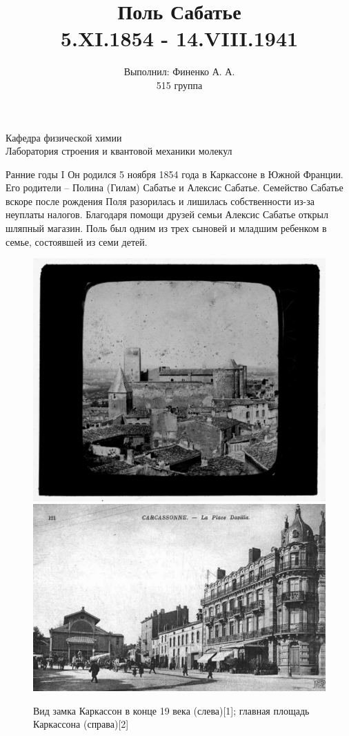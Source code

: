 \documentclass[hyperref={pdfpagelabel=false},usepdftitle=false,xcolor=dvipsnames]{beamer}
\title{\textbf{Поль Сабатье \\ 5.XI.1854 - 14.VIII.1941}}
\author{\small
\begin{flushright}
Выполнил: Финенко А. А. \\ 515 группа \\[15ex]
\end{flushright}
}
\institute[MSU] %
{\small МГУ им. М.В.Ломоносова, Химический факультет, 2017}
\date{}
\begin{document}
\begin{frame}
{
\vspace*{-0.75cm}
\large 
\begin{center}
Кафедра физической химии \\
Лаборатория строения и квантовой механики молекул
\vspace*{-0.75cm}
\end{center}}
 \titlepage
\end{frame}

\begin{frame}{Ранние годы I}
Он родился 5 ноября 1854 года в Каркассоне в Южной Франции. Его родители -- Полина (Гилам) Сабатье и Алексис Сабатье. Семейство Сабатье вскоре после рождения Поля разорилась и лишилась собственности из-за неуплаты налогов. Благодаря помощи друзей семьи Алексис Сабатье открыл шляпный магазин. Поль был одним из трех сыновей и младшим ребенком в семье, состоявшей из семи детей. 
\begin{figure}	
	\includegraphics[width=0.37\linewidth]{pictures/carcassone1.jpg}
	\hspace{0.2cm}
	\includegraphics[width=0.48\linewidth]{pictures/carcassone2.jpg}
	\caption{Вид замка Каркассон в конце 19 века (слева)[1]; главная площадь Каркассона (справа)[2]}
\end{figure}

\end{frame}
\end{document}
